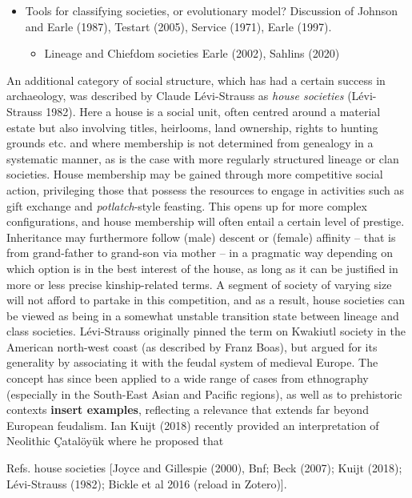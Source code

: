 \documentclass[
  12pt,
]{book}
\providecommand{\tightlist}{%
  \setlength{\itemsep}{0pt}\setlength{\parskip}{0pt}}
\begin{document}
\begin{itemize}
\item
  Tools for classifying societies, or evolutionary model? Discussion of Johnson and Earle (1987), Testart (2005), Service (1971), Earle (1997).

  \begin{itemize}
  \tightlist
  \item
    Lineage and Chiefdom societies Earle (2002), Sahlins (2020)
  \end{itemize}
\end{itemize}

An additional category of social structure, which has had a certain success in archaeology, was described by Claude Lévi-Strauss as \emph{house societies} (Lévi-Strauss 1982). Here a house is a social unit, often centred around a material estate but also involving titles, heirlooms, land ownership, rights to hunting grounds etc. and where membership is not determined from genealogy in a systematic manner, as is the case with more regularly structured lineage or clan societies. House membership may be gained through more competitive social action, privileging those that possess the resources to engage in activities such as gift exchange and \emph{potlatch}-style feasting. This opens up for more complex configurations, and house membership will often entail a certain level of prestige. Inheritance may furthermore follow (male) descent or (female) affinity -- that is from grand-father to grand-son via mother -- in a pragmatic way depending on which option is in the best interest of the house, as long as it can be justified in more or less precise kinship-related terms. A segment of society of varying size will not afford to partake in this competition, and as a result, house societies can be viewed as being in a somewhat unstable transition state between lineage and class societies. Lévi-Strauss originally pinned the term on Kwakiutl society in the American north-west coast (as described by Franz Boas), but argued for its generality by associating it with the feudal system of medieval Europe. The concept has since been applied to a wide range of cases from ethnography (especially in the South-East Asian and Pacific regions), as well as to prehistoric contexts \textbf{insert examples}, reflecting a relevance that extends far beyond European feudalism. Ian Kuijt (2018) recently provided an interpretation of Neolithic Çatalöyük where he proposed that

Refs. house societies {[}Joyce and Gillespie (2000), Bnf; Beck (2007); Kuijt (2018); Lévi-Strauss (1982); Bickle et al 2016 (reload in Zotero){]}.
\end{document}

